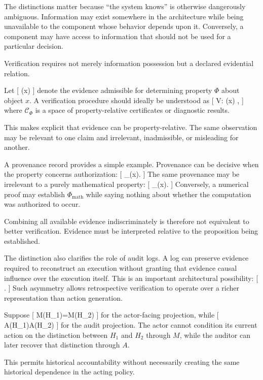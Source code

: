 \documentclass[11pt]{article}
\begin{document}
The distinctions matter because ``the system knows'' is otherwise dangerously ambiguous. Information may exist somewhere in the architecture while being unavailable to the component whose behavior depends upon it. Conversely, a component may have access to information that should not be used for a particular decision.

Verification requires not merely information possession but a declared evidential relation.

Let
[
(x)
]
denote the evidence admissible for determining property $\Phi$ about object $x$. A verification procedure should ideally be understood as
[
V\Phi:
(x)
\rightarrow
{},
]
where $\mathcal{C}_{\Phi}$ is a space of property-relative certificates or diagnostic results.

This makes explicit that evidence can be property-relative. The same observation may be relevant to one claim and irrelevant, inadmissible, or misleading for another.

A provenance record provides a simple example. Provenance can be decisive when the property concerns authorization:
[
\Phi_{}(x).
]
The same provenance may be irrelevant to a purely mathematical property:
[
\Phi_{}(x).
]
Conversely, a numerical proof may establish $\Phi_{\mathrm{math}}$ while saying nothing about whether the computation was authorized to occur.

Combining all available evidence indiscriminately is therefore not equivalent to better verification. Evidence must be interpreted relative to the proposition being established.

The distinction also clarifies the role of audit logs. A log can preserve evidence required to reconstruct an execution without granting that evidence causal influence over the execution itself. This is an important architectural possibility:
[
.
]
Such asymmetry allows retrospective verification to operate over a richer representation than action generation.

Suppose
[
M(H_1)=M(H_2)
]
for the actor-facing projection, while
[
A(H_1)\neq A(H_2)
]
for the audit projection. The actor cannot condition its current action on the distinction between $H_1$ and $H_2$ through $M$, while the auditor can later recover that distinction through $A$.

This permits historical accountability without necessarily creating the same historical dependence in the acting policy.
\end{document}
